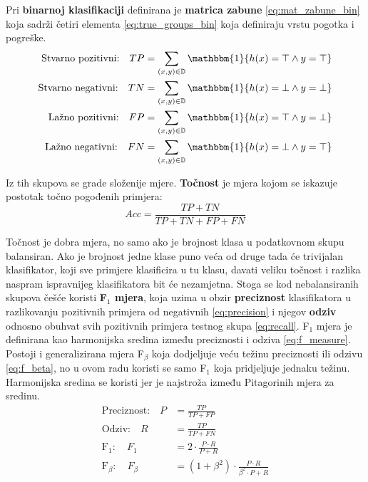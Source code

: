 \documentclass[times, utf8, numeric, diplomski]{fer}
\def\F1{F$_1$}
\begin{document}
Pri \textbf{binarnoj klasifikaciji} definirana je \textbf{matrica zabune} \eqref{eq:mat_zabune_bin} koja sadrži četiri elementa \eqref{eq:true_groups_bin} koja definiraju vrstu pogotka i pogreške.
\begin{align}
\label{eq:true_groups_bin}
\begin{split}
\text{Stvarno pozitivni:} \quad TP &= \sum_{(x,y)\in\mathbb{D}} \mathbbm{1} \{h(x) = \top \wedge y = \top \} \\
\text{Stvarno negativni:} \quad TN &= \sum_{(x,y)\in\mathbb{D}} \mathbbm{1} \{h(x) = \bot \wedge y = \bot \} \\
\text{Lažno pozitivni:}   \quad FP &= \sum_{(x,y)\in\mathbb{D}} \mathbbm{1} \{h(x) = \top \wedge y = \bot \} \\
\text{Lažno negativni:}   \quad FN &= \sum_{(x,y)\in\mathbb{D}} \mathbbm{1} \{h(x) = \bot \wedge y = \top \}
\end{split}
\end{align}

Iz tih skupova se grade složenije mjere. \textbf{Točnost} je mjera kojom se iskazuje postotak točno pogođenih primjera:
\begin{equation}
Acc = \frac{TP+TN}{TP+TN+FP+FN}
\end{equation}

Točnost je dobra mjera, no samo ako je brojnost klasa u podatkovnom skupu balansiran. Ako je brojnost jedne klase puno veća od druge tada će trivijalan klasifikator, koji sve primjere klasificira u tu klasu, davati veliku točnost i razlika naspram ispravnijeg klasifikatora bit će nezamjetna. Stoga se kod nebalansiranih skupova češće koristi \textbf{\F1 mjera}, koja uzima u obzir \textbf{preciznost} klasifikatora u razlikovanju pozitivnih primjera od negativnih \eqref{eq:precision} i njegov \textbf{odziv} odnosno obuhvat svih pozitivnih primjera testnog skupa \eqref{eq:recall}. \F1 mjera je definirana kao harmonijska sredina između preciznosti i odziva \eqref{eq:f_measure}. Postoji i generalizirana mjera F$_\beta$ koja dodjeljuje veću težinu preciznosti ili odzivu \eqref{eq:f_beta}, no u ovom radu koristi se samo \F1 koja pridjeljuje jednaku težinu. Harmonijska sredina se koristi jer je najstroža između Pitagorinih mjera za sredinu.
\begin{align}
\text{Preciznost:} \quad P &= \frac{TP}{TP+FP} \label{eq:precision} \\
\text{Odziv:} \quad R &= \frac{TP}{TP+FN} \label{eq:recall} \\
\text{F}_1: \quad F_1 &= 2 \cdot \frac{P \cdot R}{P + R} \label{eq:f_measure} \\
\text{F}_\beta: \quad F_\beta &= (1 + \beta^2) \cdot \frac{P \cdot R}{\beta ^2 \cdot P + R} \label{eq:f_beta}
\end{align}
\end{document}
